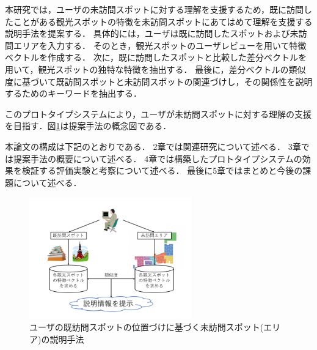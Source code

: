 \documentclass{deimj}
\begin{document}
本研究では，ユーザの未訪問スポットに対する理解を支援するため，既に訪問したことがある観光スポットの特徴を未訪問スポットにあてはめて理解を支援する説明手法を提案する．
具体的には，ユーザは既に訪問したスポットおよび未訪問エリアを入力する．
そのとき，観光スポットのユーザレビューを用いて特徴ベクトルを作成する．
次に，既に訪問したスポットと比較した差分ベクトルを用いて，観光スポットの独特な特徴を抽出する．
最後に，差分ベクトルの類似度に基づいて既訪問スポットと未訪問スポットの関連づけし，その関係性を説明するためのキーワードを抽出する．

このプロトタイプシステムにより，ユーザが未訪問スポットに対する理解の支援を目指す．図\ref{fig:photo_image}は提案手法の概念図である．

本論文の構成は下記のとおりである．
2章では関連研究について述べる．
3章では提案手法の概要について述べる．
4章では構築したプロトタイプシステムの効果を検証する評価実験と考察について述べる．
最後に5章ではまとめと今後の課題について述べる．

\begin{figure}[t]
  \begin{center}
    \includegraphics[clip,width=7.0cm]{picture/Photo_Image_jap.png}
    \caption{ユーザの既訪問スポットの位置づけに基づく未訪問スポット(エリア)の説明手法}
    \label{fig:photo_image}
   \end{center}
\end{figure}


\end{document}
